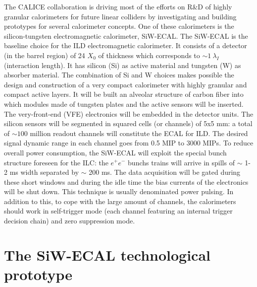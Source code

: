 \documentclass[a4paper,11pt]{article}
\begin{document}
The CALICE collaboration is driving most of the efforts on R\&D of highly granular calorimeters \cite{Sefkow:2015hna} 
for future linear colliders by investigating and building prototypes for several
calorimeter concepts. One of these calorimeters 
is the silicon-tungsten electromagnetic calorimeter, SiW-ECAL.
The SiW-ECAL is the baseline choice for the ILD electromagnetic calorimeter.
It consists of a detector (in the barrel region) of 24 $X_{0}$ of thickness which corresponds to $\sim 1~\lambda_{I}$ (interaction length).
It has silicon (Si) as active material and tungsten (W) as absorber material.
The combination of Si and W choices  makes possible the design and construction
of a very compact calorimeter with highly granular and compact active layers.
It will be built an alveolar structure of carbon fiber into which modules made of tungsten
plates and the active sensors will be inserted. The very-front-end (VFE) electronics will be
embedded in the detector units. The silicon sensors will be segmented
in squared cells (or channels) of 5x5 mm: a total of $\sim 100$ million readout channels will constitute the ECAL for ILD.
The desired signal dynamic range in each channel goes from 0.5 MIP to 3000 MIPs.
To reduce overall power consumption, the SiW-ECAL will exploit the special bunch structure
foreseen for the ILC: the $e^{+}e^{-}$ bunchs trains will arrive in spills
of $\sim$ 1-2 ms width separated by $\sim$ 200 ms. The data acquisition will be gated during these short windows and during the idle time the bias currents of the electronics will be shut down.
This technique is usually denominated power pulsing. In addition to this, to cope with the large amount of channels,
the calorimeters should work in self-trigger mode (each channel featuring an internal trigger decision chain) and zero suppression mode. 

\section{The SiW-ECAL technological prototype}
\end{document}
